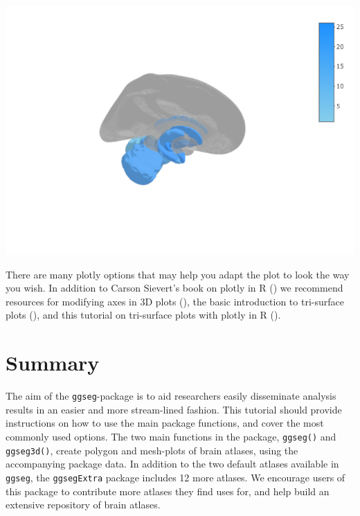 \documentclass[fleqn,10pt]{wlpeerj} %
\newenvironment{Shaded}{\begin{snugshade}}{\end{snugshade}}
\newcommand{\DataTypeTok}[1]{\textcolor[rgb]{0.13,0.29,0.53}{#1}}
\newcommand{\DecValTok}[1]{\textcolor[rgb]{0.00,0.00,0.81}{#1}}
\newcommand{\FloatTok}[1]{\textcolor[rgb]{0.00,0.00,0.81}{#1}}
\newcommand{\KeywordTok}[1]{\textcolor[rgb]{0.13,0.29,0.53}{\textbf{#1}}}
\newcommand{\NormalTok}[1]{#1}
\newcommand{\OperatorTok}[1]{\textcolor[rgb]{0.81,0.36,0.00}{\textbf{#1}}}
\newcommand{\StringTok}[1]{\textcolor[rgb]{0.31,0.60,0.02}{#1}}
\begin{document}
\begin{Shaded}
\end{Shaded}

\includegraphics[width=0.4\linewidth]{png/ggseg3d_glass}

There are many plotly options that may help you adapt the plot to look the way you wish.
In addition to Carson Sievert's book on plotly in R (\citeyearpar{plotly}) we recommend resources for modifying axes in 3D plots (\citet{plotly-ax}), the basic introduction to tri-surface plots (\citet{plotly-tri}), and this tutorial on tri-surface plots with plotly in R (\citet{plotly-trisurf}).

\hypertarget{summary}{%
\section{Summary}\label{summary}}

The aim of the \texttt{ggseg}-package is to aid researchers easily disseminate analysis results in an easier and more stream-lined fashion.
This tutorial should provide instructions on how to use the main package functions, and cover the most commonly used options.
The two main functions in the package, \texttt{ggseg()} and \texttt{ggseg3d()}, create polygon and mesh-plots of brain atlases, using the accompanying package data.
In addition to the two default atlases available in \texttt{ggseg}, the \texttt{ggsegExtra} package includes 12 more atlases.
We encourage users of this package to contribute more atlases they find uses for, and help build an extensive repository of brain atlases.
\end{document}
